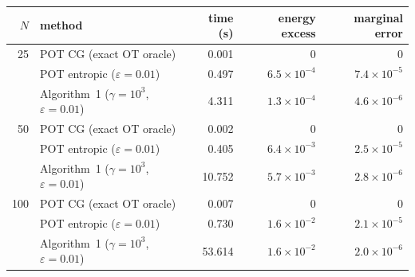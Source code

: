 \begin{tabular}{rlrrr}
\toprule
$N$ & method & time (s) & energy excess & marginal error\\
\midrule
25 & POT CG (exact OT oracle) & 0.001 & 0 & 0\\
 & POT entropic ($\varepsilon=0.01$) & 0.497 & $6.5\times10^{-4}$ & $7.4\times10^{-5}$\\
 & Algorithm~1 ($\gamma=10^3$, $\varepsilon=0.01$) & 4.311 & $1.3\times10^{-4}$ & $4.6\times10^{-6}$\\
50 & POT CG (exact OT oracle) & 0.002 & 0 & 0\\
 & POT entropic ($\varepsilon=0.01$) & 0.405 & $6.4\times10^{-3}$ & $2.5\times10^{-5}$\\
 & Algorithm~1 ($\gamma=10^3$, $\varepsilon=0.01$) & 10.752 & $5.7\times10^{-3}$ & $2.8\times10^{-6}$\\
100 & POT CG (exact OT oracle) & 0.007 & 0 & 0\\
 & POT entropic ($\varepsilon=0.01$) & 0.730 & $1.6\times10^{-2}$ & $2.1\times10^{-5}$\\
 & Algorithm~1 ($\gamma=10^3$, $\varepsilon=0.01$) & 53.614 & $1.6\times10^{-2}$ & $2.0\times10^{-6}$\\
\bottomrule
\end{tabular}
